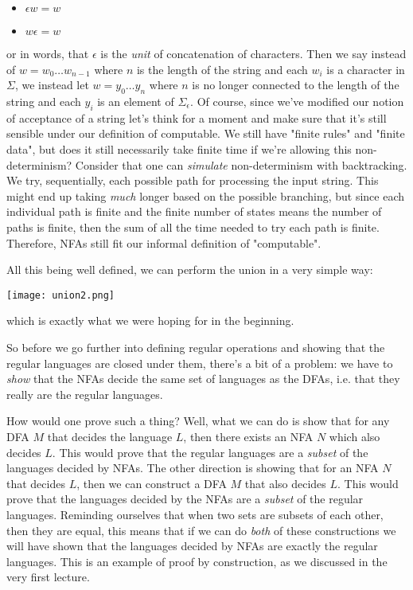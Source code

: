 \documentclass[11pt]{article}
\begin{document}
\begin{itemize}
\item $\epsilon w = w$
\item $w \epsilon = w$
\end{itemize}

or in words, that $\epsilon$ is the \emph{unit} of concatenation of characters. Then we say instead of $w = w_0 \ldots w_{n-1}$ where $n$ is the length of the string and each $w_i$ is a character in $\Sigma$, we instead let $w = y_0 \ldots y_n$ where $n$ is no longer connected to the length of the string and each $y_i$ is an element of $\Sigma_{\epsilon}$. Of course, since we've modified our notion of acceptance of a string let's think for a moment and make sure that it's still sensible under our definition of computable. We still have "finite rules" and "finite data", but does it still necessarily take finite time if we're allowing this non-determinism? Consider that one can \emph{simulate} non-determinism with backtracking. We try, sequentially, each possible path for processing the input string. This might end up taking \emph{much} longer based on the possible branching, but since each individual path is finite and the finite number of states means the number of paths is finite, then the sum of all the time needed to try each path is finite. Therefore, NFAs still fit our informal definition of "computable".

All this being well defined, we can perform the union in a very simple way: 

\texttt{[image: union2.png]}

which is exactly what we were hoping for in the beginning.

So before we go further into defining regular operations and showing that the regular languages are closed under them, there's a bit of a problem: we have to \emph{show} that the NFAs decide the same set of languages as the DFAs, i.e. that they really are the regular languages.

How would one prove such a thing? Well, what we can do is show that for any DFA $M$ that decides the language $L$, then there exists an NFA $N$ which also decides $L$. This would prove that the regular languages are a \emph{subset} of the languages decided by NFAs. The other direction is showing that for an NFA $N$ that decides $L$, then we can construct a DFA $M$ that also decides $L$. This would prove that the languages decided by the NFAs are a \emph{subset} of the regular languages. Reminding ourselves that when two sets are subsets of each other, then they are equal, this means that if we can do \emph{both} of these constructions we will have shown that the languages decided by NFAs are exactly the regular languages. This is an example of proof by construction, as we discussed in the very first lecture.
\end{document}
